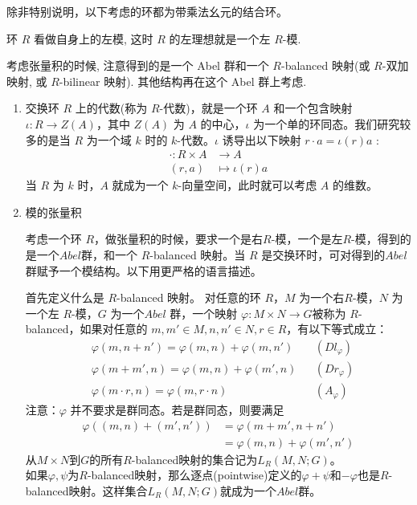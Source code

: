 \documentclass{ctexart}
\begin{document}
除非特别说明，以下考虑的环都为带乘法幺元的结合环。

环 $R$ 看做自身上的左模, 这时 $R$ 的左理想就是一个左 $R$-模.

考虑张量积的时候, 注意得到的是一个 Abel 群和一个 $R$-balanced 映射(或 $R$-双加映射, 或 $R$-bilinear 映射). 其他结构再在这个 Abel 群上考虑.

\begin{enumerate}
\item \cite[p.33]{barot2014introduction}交换环 $R$ 上的代数(称为 $R$-代数)，就是一个环 $A$ 和一个包含映射 $\iota : R \to Z(A)$，其中 $Z(A)$ 为 $A$ 的中心，$\iota$ 为一个单的环同态。我们研究较多的是当 $R$ 为一个域 $k$ 时的 $k$-代数。$\iota$ 诱导出以下映射 $r \cdot a = \iota(r)a$ :
\begin{align*}
\cdot : R \times A &\to A\\
(r,a) &\mapsto \iota(r)a
\end{align*}
当 $R$ 为 $k$ 时，$A$ 就成为一个 $k$-向量空间，此时就可以考虑 $A$ 的维数。

\item 模的张量积

考虑一个环 $R$，做张量积的时候，要求一个是右$R$-模，一个是左$R$-模，得到的是一个$Abel$群，和一个 $R$-balanced 映射。当 $R$ 是交换环时，可对得到的$Abel$群赋予一个模结构。以下用更严格的语言描述。

首先定义什么是 $R$-balanced 映射。
对任意的环 $R$，$M$ 为一个右$R$-模，$N$ 为一个左 $R$-模，$G$ 为一个$Abel$ 群，一个映射 $\varphi : M \times N \to G$被称为 $R$-balanced，如果对任意的 $m,m'\in M, n,n'\in N, r\in R$，有以下等式成立：
\begin{align*}
&\varphi(m, n+n') = \varphi(m,n) + \varphi(m,n')&&\text{$(Dl_\varphi)$}\\
&\varphi(m+m', n) = \varphi(m,n) + \varphi(m',n)&&\text{$(Dr_\varphi)$}\\
&\varphi(m\cdot r, n) = \varphi(m, r\cdot n)&&\text{$(A_\varphi)$}
\end{align*}
注意：$\varphi$ 并不要求是群同态。若是群同态，则要满足
\begin{align*}
\varphi((m,n)+(m',n')) &= \varphi(m+m',n+n')\\
                       &= \varphi(m,n) + \varphi(m',n')
\end{align*}
从$M \times N$到$G$的所有$R$-balanced映射的集合记为$L_R(M,N;G)$。\\
如果$\varphi,\psi$为$R$-balanced映射，那么逐点(pointwise)定义的$\varphi + \psi$和$-\varphi$也是$R$-balanced映射。这样集合$L_R(M,N;G)$就成为一个$Abel$群。\\


\end{enumerate}
\end{document}
